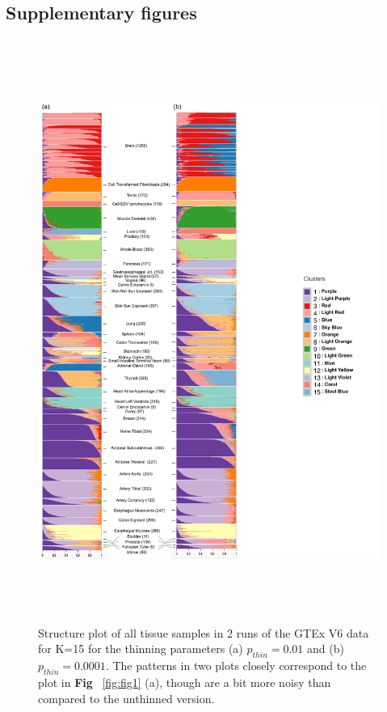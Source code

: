  \subsection{Supplementary figures}
 
 \begin{figure}[ht]
 \centering
\includegraphics[height=7.5in, width=6.5in]{../plots/gtex-figures/gtex2_02_29_16.pdf}
    \caption{Structure plot of all tissue samples in 2 runs of the GTEx V6 data for  K=15 for the thinning parameters (a) $p_{thin}=0.01$ and (b) $p_{thin}=0.0001$. The patterns in two plots closely correspond to the plot in \textbf{Fig} ~\ref{fig:fig1} (a), though are a bit more noisy than compared to the unthinned version. }
 \label{fig:figS1}
    \end{figure}

